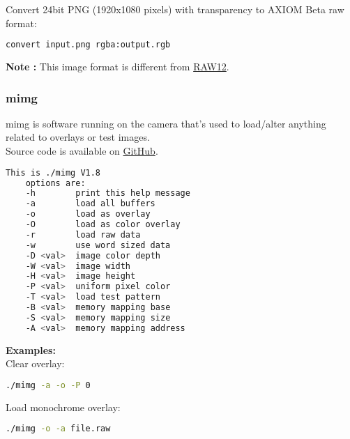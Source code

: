 Convert 24bit PNG (1920x1080 pixels) with transparency to AXIOM Beta raw format: 

\begin{lstlisting}[language=bash,morekeywords=$,keywordstyle=\bfseries,frame=none,xleftmargin=.25in,belowskip=2em, aboveskip=2em]
convert input.png rgba:output.rgb
\end{lstlisting}

\textbf{Note :} This image format is different from \href{https://wiki.apertus.org/index.php/RAW12}{RAW12}.


\subsubsection{mimg}

mimg is software running on the camera that's used to load/alter anything related to overlays or test images.\\

Source code is available on \href{https://github.com/apertus-open-source-cinema/beta-software/tree/master/mimg}{GitHub}.

\begin{lstlisting}[language=bash,morekeywords=$,keywordstyle=\bfseries,frame=none,xleftmargin=.25in,belowskip=2em, aboveskip=2em]
    This is ./mimg V1.8
    options are:
    -h        print this help message
    -a        load all buffers
    -o        load as overlay
    -O        load as color overlay
    -r        load raw data
    -w        use word sized data
    -D <val>  image color depth
    -W <val>  image width
    -H <val>  image height
    -P <val>  uniform pixel color
    -T <val>  load test pattern
    -B <val>  memory mapping base
    -S <val>  memory mapping size
    -A <val>  memory mapping address
\end{lstlisting} 

\textbf{Examples:}\\


Clear overlay: 

\begin{lstlisting}[language=bash,morekeywords=$,keywordstyle=\bfseries,frame=none,xleftmargin=.25in,belowskip=2em, aboveskip=2em]
./mimg -a -o -P 0
\end{lstlisting} 


Load monochrome overlay: 

\begin{lstlisting}[language=bash,morekeywords=$,keywordstyle=\bfseries,frame=none,xleftmargin=.25in,belowskip=2em, aboveskip=2em]
./mimg -o -a file.raw
\end{lstlisting} 


